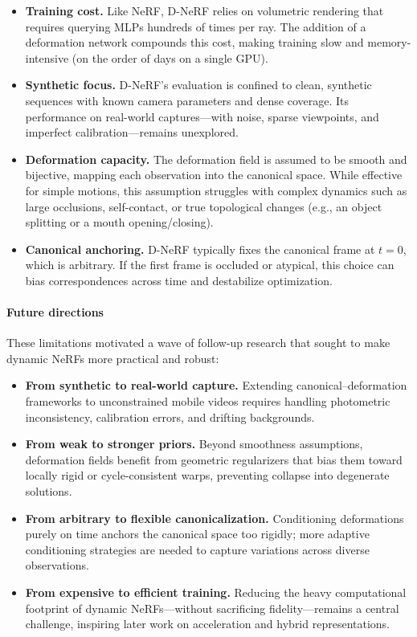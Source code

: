 \begin{enrichment}
\begin{enrichment}
    \begin{itemize}
        \item \textbf{Training cost.} Like NeRF, D-NeRF relies on volumetric rendering that requires querying MLPs hundreds of times per ray. The addition of a deformation network compounds this cost, making training slow and memory-intensive (on the order of days on a single GPU).
        \item \textbf{Synthetic focus.} D-NeRF’s evaluation is confined to clean, synthetic sequences with known camera parameters and dense coverage. Its performance on real-world captures—with noise, sparse viewpoints, and imperfect calibration—remains unexplored.
        \item \textbf{Deformation capacity.} The deformation field is assumed to be smooth and bijective, mapping each observation into the canonical space. While effective for simple motions, this assumption struggles with complex dynamics such as large occlusions, self-contact, or true topological changes (e.g., an object splitting or a mouth opening/closing).
        \item \textbf{Canonical anchoring.} D-NeRF typically fixes the canonical frame at $t=0$, which is arbitrary. If the first frame is occluded or atypical, this choice can bias correspondences across time and destabilize optimization.
    \end{itemize}
    
    \paragraph{Future directions}
    \label{par:chapter23_dnerf_future}
    These limitations motivated a wave of follow-up research that sought to make dynamic NeRFs more practical and robust:
    
    \begin{itemize}
        \item \textbf{From synthetic to real-world capture.} Extending canonical–deformation frameworks to unconstrained mobile videos requires handling photometric inconsistency, calibration errors, and drifting backgrounds.
        \item \textbf{From weak to stronger priors.} Beyond smoothness assumptions, deformation fields benefit from geometric regularizers that bias them toward locally rigid or cycle-consistent warps, preventing collapse into degenerate solutions.
        \item \textbf{From arbitrary to flexible canonicalization.} Conditioning deformations purely on time anchors the canonical space too rigidly; more adaptive conditioning strategies are needed to capture variations across diverse observations.
        \item \textbf{From expensive to efficient training.} Reducing the heavy computational footprint of dynamic NeRFs—without sacrificing fidelity—remains a central challenge, inspiring later work on acceleration and hybrid representations.
    \end{itemize}
    

\end{enrichment}
\end{enrichment}
